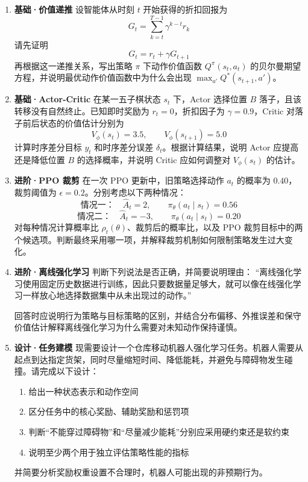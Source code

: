 \documentclass[UTF8,a4paper,zihao=-4,oneside,openany]{ctexbook}
\begin{document}
\begin{exercisebox}
  \begin{enumerate}
    \item \textbf{基础·价值递推} 设智能体从时刻 $t$ 开始获得的折扣回报为
    \[
    G_t=\sum_{k=t}^{T-1}\gamma^{k-t}r_k
    \]
    请先证明
    \[
    G_t=r_t+\gamma G_{t+1}
    \]
    再根据这一递推关系，写出策略 $\pi$ 下动作价值函数 $Q^\pi(s_t,a_t)$ 的贝尔曼期望方程，并说明最优动作价值函数中为什么会出现
    $\max_{a'}Q^*(s_{t+1},a')$。

    \item \textbf{基础·Actor-Critic} 在某一五子棋状态 $s_t$ 下，Actor 选择位置 $B$ 落子，且该转移没有自然终止。已知即时奖励为
    $r_t=0$，折扣因子为 $\gamma=0.9$，Critic 对落子前后状态的价值估计分别为
    \[
    V_\phi(s_t)=3.5,\qquad V_\phi(s_{t+1})=5.0
    \]
    计算时序差分目标 $y_t$ 和时序差分误差 $\delta_t$。根据计算结果，说明 Actor 应提高还是降低位置 $B$ 的选择概率，并说明 Critic 应如何调整对 $V_\phi(s_t)$ 的估计。

    \item \textbf{进阶·PPO 裁剪} 在一次 PPO 更新中，旧策略选择动作 $a_t$ 的概率为 $0.40$，裁剪阈值为
    $\epsilon=0.2$。分别考虑以下两种情况：
    \[
    \text{情况一：}\quad \widehat{A}_t=2,\qquad \pi_\theta(a_t\mid s_t)=0.56
    \]
    \[
    \text{情况二：}\quad \widehat{A}_t=-3,\qquad \pi_\theta(a_t\mid s_t)=0.20
    \]
    对每种情况计算概率比 $\rho_t(\theta)$、裁剪后的概率比，以及 PPO 裁剪目标中的两个候选项。判断最终采用哪一项，并解释裁剪机制如何限制策略发生过大变化。

    \item \textbf{进阶·离线强化学习} 判断下列说法是否正确，并简要说明理由：  
    “离线强化学习使用固定历史数据进行训练，因此只要数据量足够大，就可以像在线强化学习一样放心地选择数据集中从未出现过的动作。”

    回答时应说明行为策略与目标策略的区别，并结合分布偏移、外推误差和保守价值估计解释离线强化学习为什么需要对未知动作保持谨慎。

    \item \textbf{设计·任务建模} 现需要设计一个仓库移动机器人强化学习任务。机器人需要从起点到达指定货架，同时尽量缩短时间、降低能耗，并避免与障碍物发生碰撞。请完成以下设计：
    \begin{enumerate}
      \item 给出一种状态表示和动作空间
      \item 区分任务中的核心奖励、辅助奖励和惩罚项
      \item 判断“不能穿过障碍物”和“尽量减少能耗”分别应采用硬约束还是软约束
      \item 说明至少两个用于独立评估策略性能的指标
    \end{enumerate}
    并简要分析奖励权重设置不合理时，机器人可能出现的非预期行为。


\end{enumerate}
\end{exercisebox}
\end{document}
